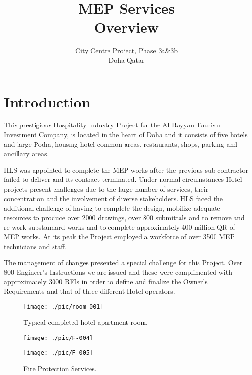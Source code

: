 \documentclass[oneside, justified, 11pt, a4paper]{tufte-book}
\title{MEP Services\\\noindent Overview}
\author{City Centre Project, Phase 3a\&3b\\\noindent Doha Qatar}
\begin{document}
\maketitle

\mainmatter

\chapter{Introduction}


This prestigious Hospitality Industry Project for the Al Rayyan Tourism Investment Company, is located in the heart of Doha and it consists of five hotels and large Podia, housing hotel common areas, restaurants, shops, parking  and ancillary areas. 

HLS was appointed to complete the MEP works after the previous sub-contractor failed to deliver and its contract terminated. Under normal circumstances Hotel projects present challenges due to the large number of services, their concentration and the involvement of diverse stakeholders. HLS faced the additional challenge of having to complete the design, mobilize adequate resources to produce over 2000 drawings, over 800 submittals and to remove and re-work substandard works and to complete approximately 400 million QR of MEP works. At its peak the Project employed a workforce of over 3500 MEP technicians and staff.

The management of changes presented a special challenge for this Project. Over 800 Engineer's Instructions we are issued and these were complimented with approximately 3000 RFIs in order to define and finalize the Owner's Requirements and that of three different Hotel operators. 


\begin{fullwidth}
\begin{figure}[bt]
\texttt{[image: ./pic/room-001]}
\caption{Typical completed hotel apartment room.}
\end{figure}
\end{fullwidth}

\begin{fullwidth}
\begin{figure*}[btp]
\texttt{[image: ./pic/F-004]}
\vspace*{1pt}

\texttt{[image: ./pic/F-005]}
\vspace*{1pt}

\caption{Fire Protection Services.}
\end{figure*}
\end{fullwidth}
 
\end{document}
